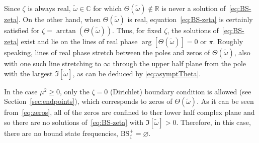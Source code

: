 \documentclass[aps, prd, amsmath, floats, floatfix, twocolumn, nofootinbib, superscriptaddress, showpacs]{revtex4-1}
\def\bC{{\mathbb C}}
\def\bR{{\mathbb R}}
\def\oo{\infty}
\def\BS{\mathrm{BS}}
\def\tomega{{\tilde{\omega}}}
\begin{document}
Since $\zeta$ is always real, $\tomega \in \bC$ for which
$\Theta(\tomega) \not\in \bR$ is never a solution of~\eqref{eq:BS-zeta}.
On the other hand, when $\Theta(\tomega)$ is real,
equation~\eqref{eq:BS-zeta} is certainly satisfied for $\zeta =
\arctan(\Theta(\tomega))$. Thus, for fixed $\zeta$, the solutions
of~\eqref{eq:BS-zeta} exist and lie on the lines of real phase $\arg
[\Theta(\tomega)] = 0$ or $\pi$. Roughly speaking, lines of real phase
stretch between the poles and zeros of $\Theta(\tomega)$, also with one such
line stretching to $\oo$ through the upper half plane from the
pole with the largest $\Im[\tomega]$, as can be deduced by \eqref{eq:asymptTheta}. 





In the case $\mu^2 \geqslant 0$, only the $\zeta = 0$ (Dirichlet)
boundary condition is allowed (see Section~\ref{sec:endpoints}), which
corresponds to zeros of $\Theta(\tomega)$. As it can be seen
from~\eqref{eq:zeros}, all of the zeros are confined to ther lower half complex plane and
so there are no solutions of~\eqref{eq:BS-zeta} with $\Im[\tomega] > 0$. 
Therefore, in this case, there are no bound state frequencies, $\BS_\zeta^+ =
\varnothing$.
\end{document}
